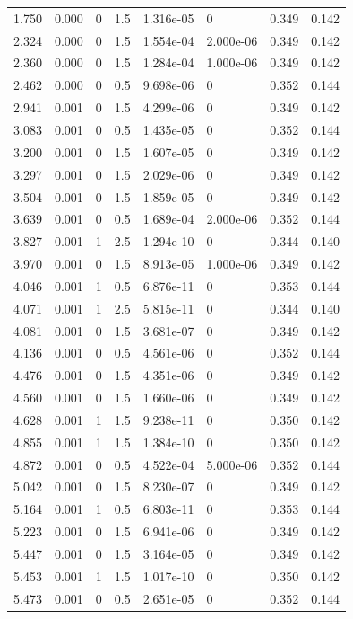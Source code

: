 \documentclass[preview]{standalone}
\begin{document}
{{\begin{tabular}{L{1.2cm}C{1.2cm} C{0.3cm}C{0.5cm} C{1.4cm}C{1.4cm} C{1.4cm}C{1.4cm}}
  1.750  &  0.000  & 0     & 1.5 &  1.316e-05  & 0  & 0.349 &  0.142   \\ 
  2.324  &  0.000  & 0     & 1.5 &  1.554e-04  & 2.000e-06  & 0.349 &  0.142   \\ 
  2.360  &  0.000  & 0     & 1.5 &  1.284e-04  & 1.000e-06  & 0.349 &  0.142   \\ 
  2.462  &  0.000  & 0     & 0.5 &  9.698e-06  & 0  & 0.352 &  0.144   \\ 
  2.941  &  0.001  & 0     & 1.5 &  4.299e-06  & 0  & 0.349 &  0.142   \\ 
  3.083  &  0.001  & 0     & 0.5 &  1.435e-05  & 0  & 0.352 &  0.144   \\ 
  3.200  &  0.001  & 0     & 1.5 &  1.607e-05  & 0  & 0.349 &  0.142   \\ 
  3.297  &  0.001  & 0     & 1.5 &  2.029e-06  & 0  & 0.349 &  0.142   \\ 
  3.504  &  0.001  & 0     & 1.5 &  1.859e-05  & 0  & 0.349 &  0.142   \\ 
  3.639  &  0.001  & 0     & 0.5 &  1.689e-04  & 2.000e-06  & 0.352 &  0.144   \\ 
  3.827  &  0.001  & 1     & 2.5 &  1.294e-10  & 0  & 0.344 &  0.140   \\ 
  3.970  &  0.001  & 0     & 1.5 &  8.913e-05  & 1.000e-06  & 0.349 &  0.142   \\ 
  4.046  &  0.001  & 1     & 0.5 &  6.876e-11  & 0  & 0.353 &  0.144   \\ 
  4.071  &  0.001  & 1     & 2.5 &  5.815e-11  & 0  & 0.344 &  0.140   \\ 
  4.081  &  0.001  & 0     & 1.5 &  3.681e-07  & 0  & 0.349 &  0.142   \\ 
  4.136  &  0.001  & 0     & 0.5 &  4.561e-06  & 0  & 0.352 &  0.144   \\ 
  4.476  &  0.001  & 0     & 1.5 &  4.351e-06  & 0  & 0.349 &  0.142   \\ 
  4.560  &  0.001  & 0     & 1.5 &  1.660e-06  & 0  & 0.349 &  0.142   \\ 
  4.628  &  0.001  & 1     & 1.5 &  9.238e-11  & 0  & 0.350 &  0.142   \\ 
  4.855  &  0.001  & 1     & 1.5 &  1.384e-10  & 0  & 0.350 &  0.142   \\ 
  4.872  &  0.001  & 0     & 0.5 &  4.522e-04  & 5.000e-06  & 0.352 &  0.144   \\ 
  5.042  &  0.001  & 0     & 1.5 &  8.230e-07  & 0  & 0.349 &  0.142   \\ 
  5.164  &  0.001  & 1     & 0.5 &  6.803e-11  & 0  & 0.353 &  0.144   \\ 
  5.223  &  0.001  & 0     & 1.5 &  6.941e-06  & 0  & 0.349 &  0.142   \\ 
  5.447  &  0.001  & 0     & 1.5 &  3.164e-05  & 0  & 0.349 &  0.142   \\ 
  5.453  &  0.001  & 1     & 1.5 &  1.017e-10  & 0  & 0.350 &  0.142   \\ 
  5.473  &  0.001  & 0     & 0.5 &  2.651e-05  & 0  & 0.352 &  0.144   \\ 
\hline 
\end{tabular} 

}}
\end{document}
